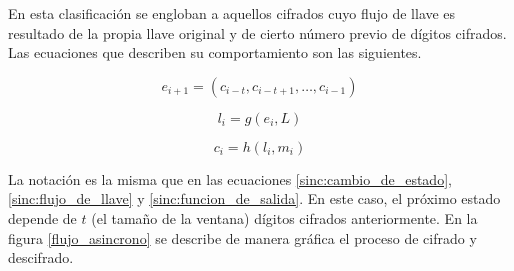 En esta clasificación se engloban a aquellos cifrados cuyo flujo de llave es
resultado de la propia llave original y de cierto número previo de dígitos
cifrados. Las ecuaciones que describen su comportamiento son las siguientes.

\begin{equation}
  \label{asinc:cambio_de_estado}
  e_{i+1} = (c_{i - t}, c_{i - t + 1}, \dots, c_{i - 1})
\end{equation}

\begin{equation}
  \label{asinc:flujo_de_llave}
  l_i = g(e_i, L)
\end{equation}

\begin{equation}
  \label{asinc:funcion_de_salida}
  c_i = h(l_i, m_i)
\end{equation}

\vspace{0.5cm}

La notación es la misma que en las ecuaciones \ref{sinc:cambio_de_estado},
\ref{sinc:flujo_de_llave} y \ref{sinc:funcion_de_salida}. En este caso, el
próximo estado depende de $ t $ (el tamaño de la ventana) dígitos cifrados
anteriormente. En la figura \ref{flujo_asincrono} se describe de manera
gráfica el proceso de cifrado y descifrado.

\vspace{0.5cm}


